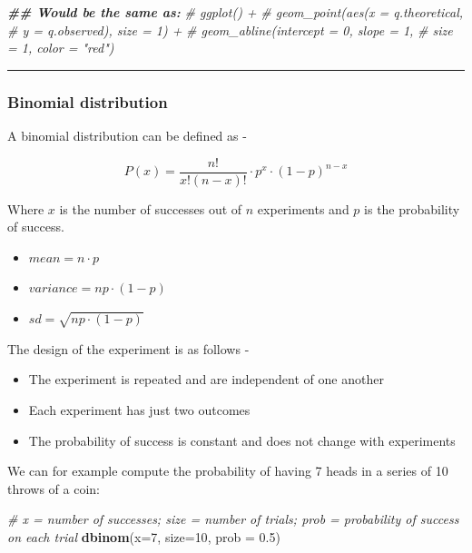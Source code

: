 \documentclass[
]{book}
\newenvironment{Shaded}{\begin{snugshade}}{\end{snugshade}}
\newcommand{\AttributeTok}[1]{\textcolor[rgb]{0.13,0.29,0.53}{#1}}
\newcommand{\CommentTok}[1]{\textcolor[rgb]{0.56,0.35,0.01}{\textit{#1}}}
\newcommand{\DecValTok}[1]{\textcolor[rgb]{0.00,0.00,0.81}{#1}}
\newcommand{\DocumentationTok}[1]{\textcolor[rgb]{0.56,0.35,0.01}{\textbf{\textit{#1}}}}
\newcommand{\FloatTok}[1]{\textcolor[rgb]{0.00,0.00,0.81}{#1}}
\newcommand{\FunctionTok}[1]{\textcolor[rgb]{0.13,0.29,0.53}{\textbf{#1}}}
\newcommand{\NormalTok}[1]{#1}
\providecommand{\tightlist}{%
  \setlength{\itemsep}{0pt}\setlength{\parskip}{0pt}}
\begin{document}
\begin{Shaded}
\begin{Highlighting}[]
\DocumentationTok{\#\# Would be the same as:}
\CommentTok{\# ggplot() +}
\CommentTok{\#   geom\_point(aes(x = q.theoretical, }
\CommentTok{\#                  y = q.observed), size = 1) +}
\CommentTok{\#   geom\_abline(intercept = 0, slope = 1, }
\CommentTok{\#               size = 1, color = "red") }
\end{Highlighting}
\end{Shaded}

\begin{center}\rule{0.5\linewidth}{0.5pt}\end{center}

\hypertarget{binomial-distribution}{%
\subsubsection{Binomial distribution}\label{binomial-distribution}}

A binomial distribution can be defined as -

\[P(x) = \frac{n!}{x!(n-x)!}\cdot p^x \cdot (1-p)^{n-x}\]

Where \(x\) is the number of successes out of \(n\) experiments and \(p\) is the probability of success.

\begin{itemize}
\tightlist
\item
  \(mean = n \cdot p\)
\item
  \(variance = np \cdot (1 - p)\)
\item
  \(sd = \sqrt{np \cdot (1 - p)}\)
\end{itemize}

The design of the experiment is as follows -

\begin{itemize}
\tightlist
\item
  The experiment is repeated and are independent of one another
\item
  Each experiment has just two outcomes
\item
  The probability of success is constant and does not change with experiments
\end{itemize}

We can for example compute the probability of having 7 heads in a series of 10 throws of a coin:

\begin{Shaded}
\begin{Highlighting}[]
\CommentTok{\# x = number of successes; size = number of trials; prob = probability of success on each trial}
\FunctionTok{dbinom}\NormalTok{(}\AttributeTok{x=}\DecValTok{7}\NormalTok{, }\AttributeTok{size=}\DecValTok{10}\NormalTok{, }\AttributeTok{prob =} \FloatTok{0.5}\NormalTok{) }
\end{Highlighting}
\end{Shaded}
\end{document}
